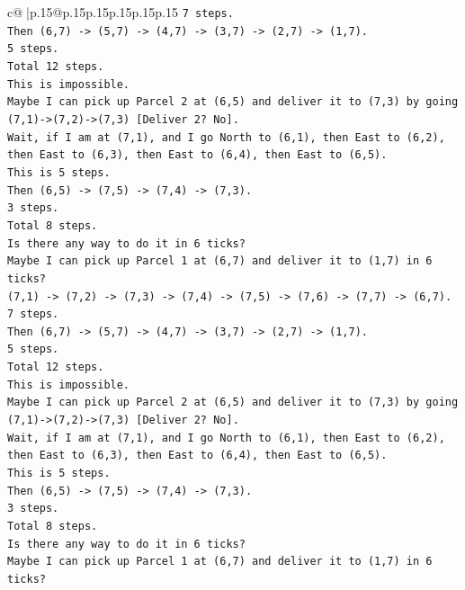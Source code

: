\documentclass{article}
\begin{document}
{\begin{supertabular}{c@{$\;$}|p{.15\linewidth}@{}p{.15\linewidth}p{.15\linewidth}p{.15\linewidth}p{.15\linewidth}p{.15\linewidth}}
{{{\texttt{7 steps.} \\
\texttt{Then (6,7) {-}> (5,7) {-}> (4,7) {-}> (3,7) {-}> (2,7) {-}> (1,7).} \\
\texttt{5 steps.} \\
\texttt{Total 12 steps.} \\
\texttt{This is impossible.} \\
\texttt{Maybe I can pick up Parcel 2 at (6,5) and deliver it to (7,3) by going (7,1){-}>(7,2){-}>(7,3) {[}Deliver 2? No{]}.} \\
\texttt{Wait, if I am at (7,1), and I go North to (6,1), then East to (6,2), then East to (6,3), then East to (6,4), then East to (6,5).} \\
\texttt{This is 5 steps.} \\
\texttt{Then (6,5) {-}> (7,5) {-}> (7,4) {-}> (7,3).} \\
\texttt{3 steps.} \\
\texttt{Total 8 steps.} \\
\texttt{Is there any way to do it in 6 ticks?} \\
\texttt{Maybe I can pick up Parcel 1 at (6,7) and deliver it to (1,7) in 6 ticks?} \\
\texttt{(7,1) {-}> (7,2) {-}> (7,3) {-}> (7,4) {-}> (7,5) {-}> (7,6) {-}> (7,7) {-}> (6,7).} \\
\texttt{7 steps.} \\
\texttt{Then (6,7) {-}> (5,7) {-}> (4,7) {-}> (3,7) {-}> (2,7) {-}> (1,7).} \\
\texttt{5 steps.} \\
\texttt{Total 12 steps.} \\
\texttt{This is impossible.} \\
\texttt{Maybe I can pick up Parcel 2 at (6,5) and deliver it to (7,3) by going (7,1){-}>(7,2){-}>(7,3) {[}Deliver 2? No{]}.} \\
\texttt{Wait, if I am at (7,1), and I go North to (6,1), then East to (6,2), then East to (6,3), then East to (6,4), then East to (6,5).} \\
\texttt{This is 5 steps.} \\
\texttt{Then (6,5) {-}> (7,5) {-}> (7,4) {-}> (7,3).} \\
\texttt{3 steps.} \\
\texttt{Total 8 steps.} \\
\texttt{Is there any way to do it in 6 ticks?} \\
\texttt{Maybe I can pick up Parcel 1 at (6,7) and deliver it to (1,7) in 6 ticks?} \\
}}}
\end{supertabular}}
\end{document}
